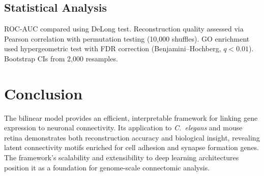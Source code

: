 \documentclass[11pt]{article}
\begin{document}
\subsection{Statistical Analysis}

ROC-AUC compared using DeLong test. Reconstruction quality assessed via Pearson correlation with permutation testing (10,000 shuffles). GO enrichment used hypergeometric test with FDR correction (Benjamini--Hochberg, $q < 0.01$). Bootstrap CIs from 2,000 resamples.

\section{Conclusion}

The bilinear model provides an efficient, interpretable framework for linking gene expression to neuronal connectivity. Its application to \textit{C.~elegans} and mouse retina demonstrates both reconstruction accuracy and biological insight, revealing latent connectivity motifs enriched for cell adhesion and synapse formation genes. The framework's scalability and extensibility to deep learning architectures position it as a foundation for genome-scale connectomic analysis.



\end{document}
